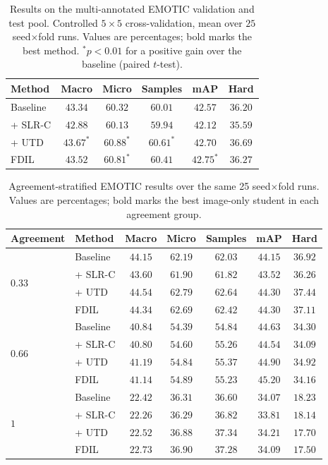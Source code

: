 {\begin{table}[h]\centering
\caption{Results on the multi-annotated EMOTIC validation and test pool. Controlled $5\times5$ cross-validation, mean over $25$
seed$\times$fold runs. Values are percentages; bold marks the best method. $^{*}p<0.01$ for a positive gain over the baseline (paired $t$-test).}
\label{tab:emotic_pool}
\begin{tabular}{lccccc}
\toprule
Method & Macro & Micro & Samples & mAP & Hard \\
\midrule
Baseline            & $43.34$ & $60.32$ & $60.01$ & $42.57$ & $36.20$ \\
\;\;+ SLR-C         & $42.88$ & $60.13$ & $59.94$ & $42.12$ & $35.59$ \\
\;\;+ UTD           & $\mathbf{43.67}^{*}$ & $\mathbf{60.88}^{*}$ & $\mathbf{60.61}^{*}$ & $42.70$ & $\mathbf{36.69}$ \\
FDIL                & $43.52$ & $60.81^{*}$ & $60.41$ & $\mathbf{42.75}^{*}$ & $36.27$ \\
\bottomrule
\end{tabular}
\end{table}

\begin{table}[h]\centering
\caption{Agreement-stratified EMOTIC results over the same 25 seed$\times$fold runs. Values are percentages; bold marks the best image-only student in each agreement group.}
\label{tab:emotic_agreement}
\begin{tabular}{llccccc}
\toprule
Agreement & Method & Macro & Micro & Samples & mAP & Hard \\
\midrule
\multirow{4}{*}{0.33}
& Baseline & $44.15$ & $62.19$ & $62.03$ & $44.15$ & $36.92$ \\
& \;\;+ SLR-C & $43.60$ & $61.90$ & $61.82$ & $43.52$ & $36.26$ \\
& \;\;+ UTD & $\mathbf{44.54}$ & $\mathbf{62.79}$ & $\mathbf{62.64}$ & $\mathbf{44.30}$ & $\mathbf{37.44}$ \\
& FDIL & $44.34$ & $62.69$ & $62.42$ & $44.30$ & $37.11$ \\
\midrule
\multirow{4}{*}{0.66}
& Baseline & $40.84$ & $54.39$ & $54.84$ & $44.63$ & $34.30$ \\
& \;\;+ SLR-C & $40.80$ & $54.60$ & $55.26$ & $44.54$ & $34.09$ \\
& \;\;+ UTD & $\mathbf{41.19}$ & $54.84$ & $\mathbf{55.37}$ & $44.90$ & $\mathbf{34.92}$ \\
& FDIL & $41.14$ & $\mathbf{54.89}$ & $55.23$ & $\mathbf{45.20}$ & $34.16$ \\
\midrule
\multirow{4}{*}{$1$}
& Baseline & $22.42$ & $36.31$ & $36.60$ & $34.07$ & $\mathbf{18.23}$ \\
& \;\;+ SLR-C & $22.26$ & $36.29$ & $36.82$ & $33.81$ & $18.14$ \\
& \;\;+ UTD & $22.52$ & $36.88$ & $\mathbf{37.34}$ & $\mathbf{34.21}$ & $17.70$ \\
& FDIL & $\mathbf{22.73}$ & $\mathbf{36.90}$ & $37.28$ & $34.09$ & $17.50$ \\
\bottomrule
\end{tabular}
\end{table}

}
